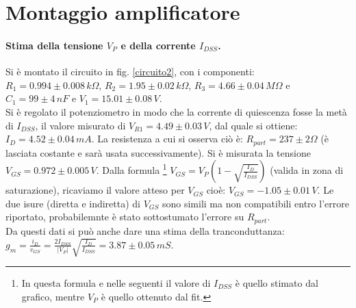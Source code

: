 \documentclass[10pt,a4paper]{article}
\begin{document}
\section{Montaggio amplificatore}

\paragraph{Stima della tensione $V_P$ e della corrente $I_{DSS}$.}
Si è montato il circuito in fig. \ref{circuito2}, con i componenti: $R_1 = 0.994\pm0.008 \, k\Omega $, $R_2 = 1.95\pm0.02 \, k \Omega $, $R_3 = 4.66 \pm 0.04 \, M \Omega$ e $C_1 = 99\pm4 \, nF$ e $V_1 = 15.01\pm0.08 \, V$. \\
Si è regolato il potenziometro in modo che la corrente di quiescenza fosse la metà di $I_{DSS}$, il valore misurato di $V_{R1} = 4.49 \pm 0.03 \, V$, dal quale si ottiene: $I_D = 4.52\pm0.04\,mA$. La resistenza a cui si osserva ciò è: $R_{part} = 237\pm2 \Omega$ (è lasciata costante e sarà usata successivamente). Si è misurata la tensione $V_{GS} = 0.972 \pm 0.005 \,V$. Dalla formula \footnote{In questa formula e nelle seguenti il valore di $I_{DSS}$ è quello stimato dal grafico, mentre $V_P$ è quello ottenuto dal fit.} $V_{GS} = V_{P} \left( 1 - \sqrt{\frac{I_D}{I_{DSS}}} \right)$ (valida in zona di saturazione), ricaviamo il valore atteso per $V_{GS}$ cioè: $V_{GS} = -1.05\pm0.01 \, V$. Le due isure (diretta e indiretta) di $V_{GS}$ sono simili ma non compatibili entro l'errore riportato, probabilemnte è stato sottostumato l'errore su $R_{part}$. \\
Da questi dati si può anche dare una stima della tranconduttanza: $g_m = \frac{i_D}{v_{GS}} = \frac{2I_{DSS}}{\vert V_P \vert} \sqrt{\frac{I_D}{I_{DSS}}} = 3.87\pm0.05\,mS$. 
\end{document}
